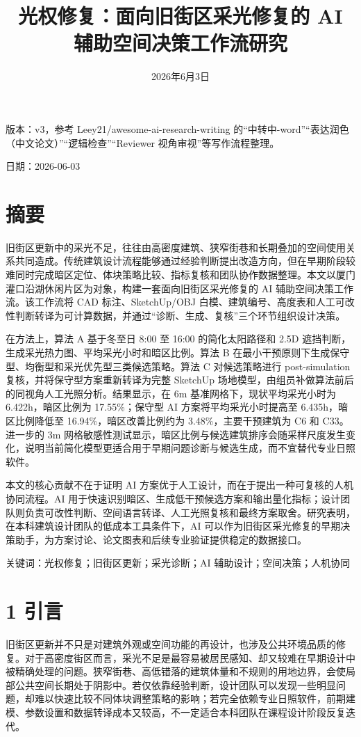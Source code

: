 \documentclass[UTF8,zihao=-4,a4paper]{ctexart}
\title{\heiti\zihao{2} 光权修复：面向旧街区采光修复的 AI 辅助空间决策工作流研究}
\author{}
\date{2026年6月3日}
\begin{document}
\maketitle

版本：v3，参考 Leey21/awesome-ai-research-writing 的“中转中-word”“表达润色（中文论文）”“逻辑检查”“Reviewer 视角审视”等写作流程整理。

日期：2026-06-03

\section{摘要}
旧街区更新中的采光不足，往往由高密度建筑、狭窄街巷和长期叠加的空间使用关系共同造成。传统建筑设计流程能够通过经验判断提出改造方向，但在早期阶段较难同时完成暗区定位、体块策略比较、指标复核和团队协作数据整理。本文以厦门灌口沿湖休闲片区为对象，构建一套面向旧街区采光修复的 AI 辅助空间决策工作流。该工作流将 CAD 标注、SketchUp/OBJ 白模、建筑编号、高度表和人工可改性判断转译为可计算数据，并通过“诊断、生成、复核”三个环节组织设计决策。

在方法上，算法 A 基于冬至日 8:00 至 16:00 的简化太阳路径和 2.5D 遮挡判断，生成采光热力图、平均采光小时和暗区比例。算法 B 在最小干预原则下生成保守型、均衡型和采光优先型三类候选策略。算法 C 对候选策略进行 post-simulation 复核，并将保守型方案重新转译为完整 SketchUp 场地模型，由组员补做算法前后的同视角人工光照分析。结果显示，在 6m 基准网格下，现状平均采光小时为 6.422h，暗区比例为 17.55\%；保守型 AI 方案将平均采光小时提高至 6.435h，暗区比例降低至 16.94\%，暗区改善比例约为 3.48\%，主要干预建筑为 C6 和 C33。进一步的 3m 网格敏感性测试显示，暗区比例与候选建筑排序会随采样尺度发生变化，说明当前简化模型更适合用于早期问题诊断与候选生成，而不宜替代专业日照软件。

本文的核心贡献不在于证明 AI 方案优于人工设计，而在于提出一种可复核的人机协同流程。AI 用于快速识别暗区、生成低干预候选方案和输出量化指标；设计团队则负责可改性判断、空间语言转译、人工光照复核和最终方案取舍。研究表明，在本科建筑设计团队的低成本工具条件下，AI 可以作为旧街区采光修复的早期决策助手，为方案讨论、论文图表和后续专业验证提供稳定的数据接口。

关键词：光权修复；旧街区更新；采光诊断；AI 辅助设计；空间决策；人机协同

\section{1 引言}
旧街区更新并不只是对建筑外观或空间功能的再设计，也涉及公共环境品质的修复。对于高密度街区而言，采光不足是最容易被居民感知、却又较难在早期设计中被精确处理的问题。狭窄街巷、高低错落的建筑体量和不规则的用地边界，会使局部公共空间长期处于阴影中。若仅依靠经验判断，设计团队可以发现一些明显问题，却难以快速比较不同体块调整策略的影响；若完全依赖专业日照软件，前期建模、参数设置和数据转译成本又较高，不一定适合本科团队在课程设计阶段反复迭代。
\end{document}
